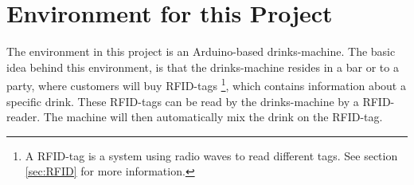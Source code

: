 \section{Environment for this Project}
The environment in this project is an Arduino-based drinks-machine. The basic idea behind this environment, is that the drinks-machine resides in a bar or to a party, where customers will buy RFID-tags \footnote{A RFID-tag is a system using radio waves to read different tags. See section \ref{sec:RFID} for more information.}, which contains information about a specific drink. These RFID-tags can be read by the drinks-machine by a RFID-reader. The machine will then automatically mix the drink on the RFID-tag.

